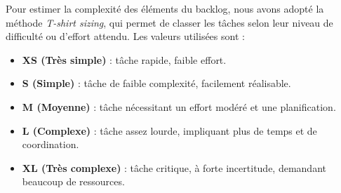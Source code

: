Pour estimer la complexité des éléments du backlog, nous avons adopté la méthode \textit{T-shirt sizing}, 
qui permet de classer les tâches selon leur niveau de difficulté ou d’effort attendu.  
Les valeurs utilisées sont :  

\begin{itemize}[label=\textbullet]
    \item \textbf{XS (Très simple)} : tâche rapide, faible effort.  
    \item \textbf{S (Simple)} : tâche de faible complexité, facilement réalisable.  
    \item \textbf{M (Moyenne)} : tâche nécessitant un effort modéré et une planification.  
    \item \textbf{L (Complexe)} : tâche assez lourde, impliquant plus de temps et de coordination.  
    \item \textbf{XL (Très complexe)} : tâche critique, à forte incertitude, demandant beaucoup de ressources.
\end{itemize}


